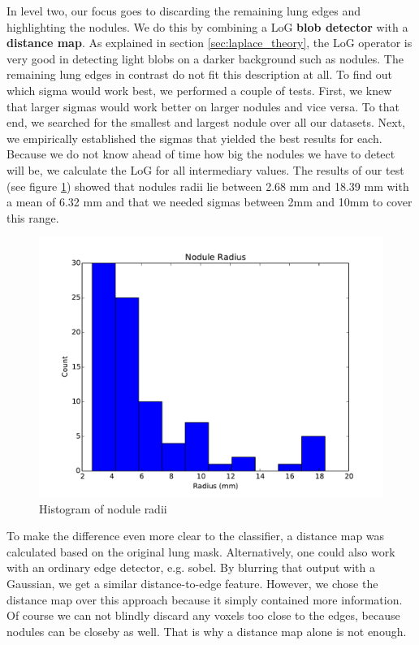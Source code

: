 In level two, our focus goes to discarding the remaining lung edges and
highlighting the nodules. We do this by combining a LoG \textbf{blob detector}
with a \textbf{distance map}. As explained in section \ref{sec:laplace_theory},
the LoG operator is very good in detecting light blobs on a darker background
such as nodules. The remaining lung edges in contrast do not fit this
description at all. To find out which sigma would work best, we performed a
couple of tests. First, we knew that larger sigmas would work better on larger
nodules and vice versa. To that end, we searched for the smallest and largest nodule
over all our datasets. Next, we empirically established the sigmas that yielded
the best results for each. Because we do not know ahead of time how big the
nodules we have to detect will be, we calculate the LoG for all intermediary
values. The results of our test (see figure \ref{fig:radii}) showed that nodules
radii lie between 2.68 mm and 18.39 mm with a mean of 6.32 mm and that
we needed sigmas between 2mm and 10mm to cover this range.

\begin{figure}[ht]
\begin{center}
  \includegraphics[width=\linewidth]{img/MaxNoduleRadii.pdf}
  \caption{Histogram of nodule radii}
  \label{fig:radii}
\end{center}
\end{figure}

To make the difference even more clear to the classifier, a distance map was
calculated based on the original lung mask. Alternatively, one could also work
with an ordinary edge detector, e.g. sobel. By blurring that output with a
Gaussian, we get a similar distance-to-edge feature. However, we chose the
distance map over this approach because it simply contained more information. Of
course we can not blindly discard any voxels too close to the edges, because
nodules can be closeby as well. That is why a distance map alone is not enough.

